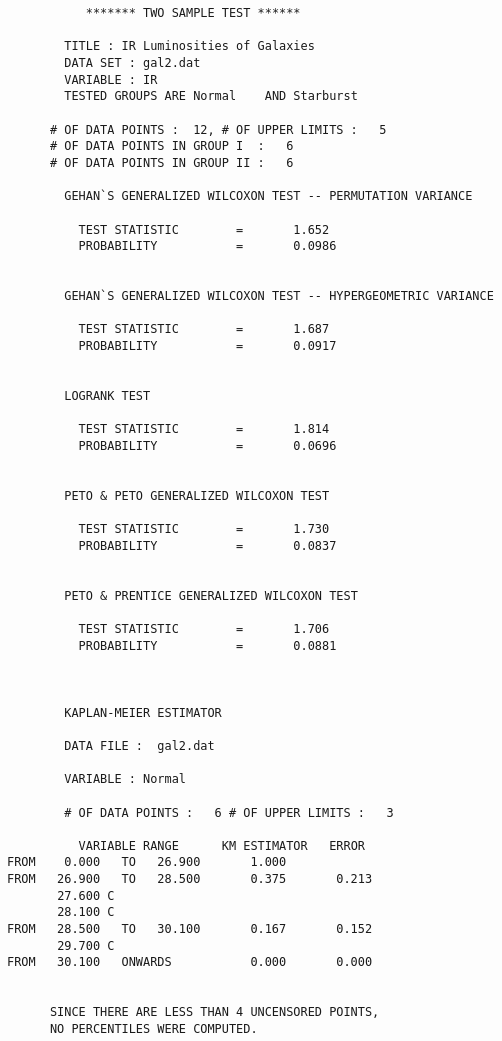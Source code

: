 \begin{small}
\begin{verbatim} 
           ******* TWO SAMPLE TEST ******

        TITLE : IR Luminosities of Galaxies                                                     
        DATA SET : gal2.dat 
        VARIABLE : IR       
        TESTED GROUPS ARE Normal    AND Starburst
     
      # OF DATA POINTS :  12, # OF UPPER LIMITS :   5
      # OF DATA POINTS IN GROUP I  :   6
      # OF DATA POINTS IN GROUP II :   6
     
        GEHAN`S GENERALIZED WILCOXON TEST -- PERMUTATION VARIANCE
     
          TEST STATISTIC        =       1.652
          PROBABILITY           =       0.0986

     
        GEHAN`S GENERALIZED WILCOXON TEST -- HYPERGEOMETRIC VARIANCE
     
          TEST STATISTIC        =       1.687
          PROBABILITY           =       0.0917

     
        LOGRANK TEST 
     
          TEST STATISTIC        =       1.814
          PROBABILITY           =       0.0696

     
        PETO & PETO GENERALIZED WILCOXON TEST
     
          TEST STATISTIC        =       1.730
          PROBABILITY           =       0.0837

     
        PETO & PRENTICE GENERALIZED WILCOXON TEST
     
          TEST STATISTIC        =       1.706
          PROBABILITY           =       0.0881

    
    
        KAPLAN-MEIER ESTIMATOR
    
        DATA FILE :  gal2.dat
    
        VARIABLE : Normal   
    
        # OF DATA POINTS :   6 # OF UPPER LIMITS :   3
    
          VARIABLE RANGE      KM ESTIMATOR   ERROR
FROM    0.000   TO   26.900       1.000
FROM   26.900   TO   28.500       0.375       0.213
       27.600 C 
       28.100 C 
FROM   28.500   TO   30.100       0.167       0.152
       29.700 C 
FROM   30.100   ONWARDS           0.000       0.000
    

      SINCE THERE ARE LESS THAN 4 UNCENSORED POINTS,
      NO PERCENTILES WERE COMPUTED.
    

\end{verbatim}
\end{small}
